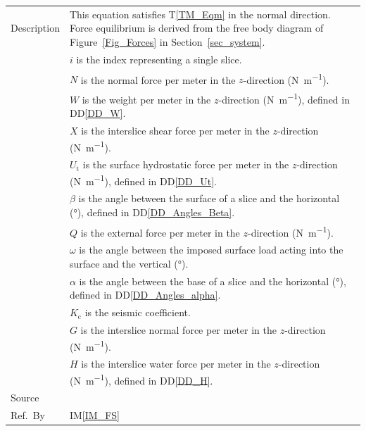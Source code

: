 \documentclass[12pt]{article}
\newcommand{\colAwidth}{0.13\textwidth}
\newcommand{\colBwidth}{0.82\textwidth}
\newcommand{\tref}[1]{T\ref{#1}}
\newcommand{\iref}[1]{IM\ref{#1}}
\newcommand{\ddref}[1]{DD\ref{#1}}
\begin{document}
\begin{minipage}{\textwidth}
\begin{tabular}{| p{\colAwidth} | p{\colBwidth}|}
  \hline Description & This equation satisfies \tref{TM_Eqm} in the normal 
  direction. Force equilibrium is derived from the free body diagram of 
  Figure~\ref{Fig_Forces} in Section~\ref{sec_system}.\\
  &$i$ is the index representing a single slice.\\
  &$N$ is the normal force per meter in the $z$-direction 
  (\si{\newton\per\meter}). \\
  &$W$ is the weight per meter in the $z$-direction (\si{\newton\per\meter}), 
  defined in \ddref{DD_W}. \\
  &$X$ is the interslice shear force per meter in the $z$-direction 
  (\si{\newton\per\meter}). \\
  &$U_\text{t}$ is the surface hydrostatic force per meter in the $z$-direction 
  (\si{\newton\per\meter}), 
  defined in \ddref{DD_Ut}. \\
  &$\beta$ is the angle between the surface of a slice and the 
  horizontal (\si{\degree}), defined in \ddref{DD_Angles_Beta}. \\
  &$Q$ is the external force per meter in the $z$-direction 
  (\si{\newton\per\meter}). \\
  &$\omega$ is the angle between the imposed surface load acting into 
  the surface and the vertical (\si{\degree}). \\
  &$\alpha$ is the angle between the base of a slice and the 
  horizontal (\si{\degree}), defined in \ddref{DD_Angles_alpha}. \\
  &$K_\text{c}$ is the seismic coefficient. \\
  &$G$ is the interslice normal force per meter in the $z$-direction 
  (\si{\newton\per\meter}). \\
  &$H$ is the interslice water force per meter in the $z$-direction 
  (\si{\newton\per\meter}), defined in 
  \ddref{DD_H}. \\

  \hline Source & \cite{ZhuEtAl2005}\\
  
  \hline Ref.\ By & \iref{IM_FS}\\
  
  \hline
\end{tabular}
\end{minipage}\\

~\newline
\end{document}
